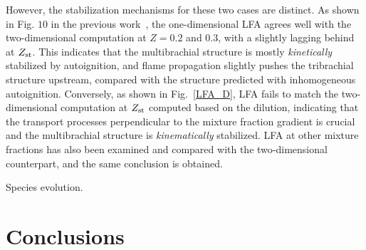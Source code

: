 \documentclass{wssci}
\begin{document}
However, the stabilization mechanisms for these two cases are distinct.  As shown in Fig. $10$ in the previous work~\cite{deng15}, the one-dimensional LFA agrees well with the two-dimensional computation at $Z = 0.2$ and $0.3$, with a slightly lagging behind at $Z_{\rm st}$.  This indicates that the multibrachial structure is mostly \emph{kinetically} stabilized by autoignition, and flame propagation slightly pushes the tribrachial structure upstream, compared with the structure predicted with inhomogeneous autoignition.  Conversely, as shown in Fig.~\ref{LFA_D}, LFA fails to match the two-dimensional computation at $Z_{\rm st}$ computed based on the dilution, indicating that the transport processes perpendicular to the mixture fraction gradient is crucial and the multibrachial structure is \emph{kinematically} stabilized.  LFA at other mixture fractions has also been examined and compared with the two-dimensional counterpart, and the same conclusion is obtained.   

Species evolution.


\section{Conclusions}


 
\end{document}
